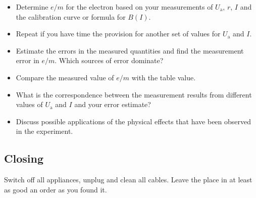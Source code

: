 \documentclass[../Elmag-labhefte-2020.tex]{subfiles}
\begin{document}
\vspace{-4mm}
\begin{itemize}
    \item Determine $e/m$ for the electron based on your measurements of $U_\mathrm{a}$, $r$, $I$ and the calibration curve or formula for $B(I)$.
    \item Repeat if you have time the provision for another set of values   for $U_\mathrm{a}$ and $I$.
    \item Estimate the errors in the measured quantities and find the measurement error in $e/m$.
    Which sources of error dominate?
    \item Compare the measured value of $e/m$ with the table value.
    \item What is the correspondence between the measurement results from different values   of $U_\mathrm{a}$ and $I$ and your error estimate?
    \item Discuss possible applications of the physical effects that have been observed in the experiment.
\end{itemize}

\subsection{Closing}
Switch off all appliances, unplug and clean all cables. Leave the place in at least as good an order as you found it.
\end{document}
